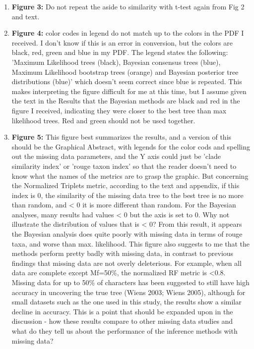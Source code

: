 \documentclass[12pt,letterpaper]{article}
\begin{document}
\begin{enumerate}
\item{\textbf{Figure 3:}} Do not repeat the aside to similarity with t-test again from Fig 2 and text.
\item{\textbf{Figure 4:}} color codes in legend do not match up to the colors in the PDF I received. I don't know if this is an error in conversion, but the colors are black, red, green and blue in my PDF. The legend states the following: 'Maximum Likelihood trees (black), Bayesian consensus trees (blue), Maximum Likelihood bootstrap trees (orange) and Bayesian posterior tree distributions (blue)' which doesn't seem correct since blue is repeated. This makes interpreting the figure difficult for me at this time, but I assume given the text in the Results that the Bayesian methods are black and red in the figure I received, indicating they were closer to the best tree than max likelihood trees. Red and green should not be used together.
\item{\textbf{Figure 5:}} This figure best summarizes the results, and a version of this should be the Graphical Abstract, with legends for the color cods and spelling out the missing data parameters, and the Y axis could just be 'clade similarity index' or 'rouge taxon index' so that the reader doesn't need to know what the names of the metrics are to grasp the graphic. But concerning the Normalized Triplets metric, according to the text and appendix, if this index is 0, the similarity of the missing data tree to the best tree is no more than random, and < 0 it is more different than random. For the Bayesian analyses, many results had values < 0 but the axis is set to 0. Why not illustrate the distribution of values that is < 0? From this result, it appears the Bayesian analysis does quite poorly with missing data in terms of rouge taxa, and worse than max. likelihood. This figure also suggests to me that the methods perform pretty badly with missing data, in contrast to previous findings that missing data are not overly deleterious. For example, when all data are complete except Mf=50\%, the normalized RF metric is <0.8. Missing data for up to 50\% of characters has been suggested to still have high accuracy in uncovering the true tree (Wiens 2003; Wiens 2005), although for small datasets such as the one used in this study, the results show a similar decline in accuracy. This is a point that should be expanded upon in the discussion - how these results compare to other missing data studies and what do they tell us about the performance of the inference methods with missing data?

\end{enumerate}
\end{document}
